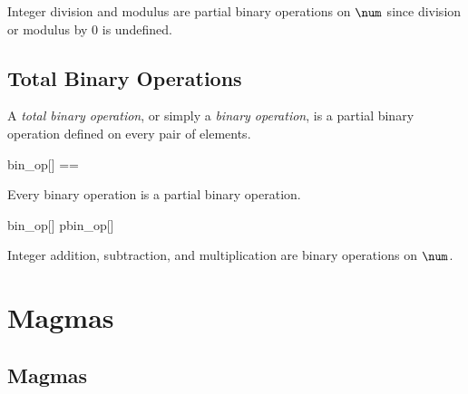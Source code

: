 \documentclass{amsart}
\begin{document}
\begin{example}

Integer division and modulus are partial binary operations on $\num$ since division or modulus by $0$ is
undefined.


\end{example}

\subsection{Total Binary Operations}

A \textit{total binary operation}, or simply a \textit{binary operation}, is a partial binary operation defined on
every pair of elements.

\begin{zed}
	bin\_op[\genT] == \genT \cross \genT \fun \genT
\end{zed}

\begin{remark} Every binary operation is a partial binary operation.

\begin{zed}
	bin\_op[\setT] \subseteq pbin\_op[\setT]
\end{zed}

\end{remark}

\begin{example}

Integer addition, subtraction, and multiplication are binary operations on $\num$.


\end{example}

\section{Magmas}

\subsection{Magmas}
\end{document}
